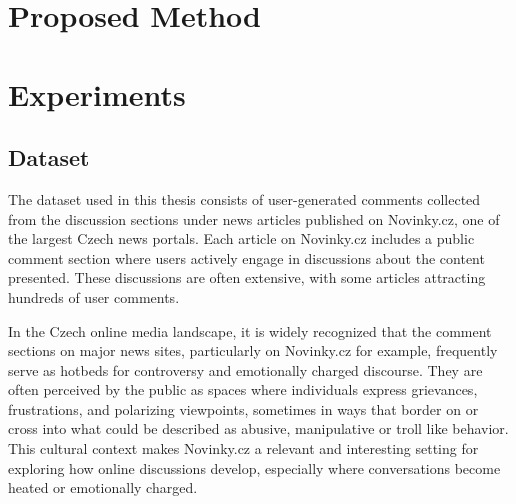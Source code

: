 \documentclass[twoside]{ctuthesis}
\theoremstyle{plain}
\theoremstyle{definition}
\theoremstyle{note}
\begin{document}

\chapter{Proposed Method}



\chapter{Experiments}

\section{Dataset}
The dataset used in this thesis consists of user-generated comments collected from the discussion sections under news articles published on Novinky.cz, one of the largest Czech news portals. Each article on Novinky.cz includes a public comment section where users actively engage in discussions about the content presented. These discussions are often extensive, with some articles attracting hundreds of user comments.\par

In the Czech online media landscape, it is widely recognized that the comment sections on major news sites, particularly on Novinky.cz for example, frequently serve as hotbeds for controversy and emotionally charged discourse. They are often perceived by the public as spaces where individuals express grievances, frustrations, and polarizing viewpoints, sometimes in ways that border on or cross into what could be described as abusive, manipulative or troll like behavior. This cultural context makes Novinky.cz a relevant and interesting setting for exploring how online discussions develop, especially where conversations become heated or emotionally charged.\par
\end{document}
